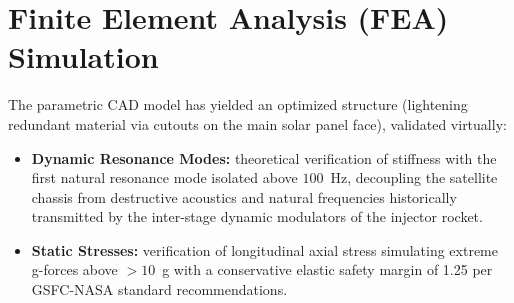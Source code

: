 \section{Finite Element Analysis (FEA) Simulation}
The parametric CAD model has yielded an optimized structure (lightening redundant material via cutouts on the main solar panel face), validated virtually:
\begin{itemize}
    \item \textbf{Dynamic Resonance Modes:} theoretical verification of stiffness with the first natural resonance mode isolated above $100$~Hz, decoupling the satellite chassis from destructive acoustics and natural frequencies historically transmitted by the inter-stage dynamic modulators of the injector rocket.
    \item \textbf{Static Stresses:} verification of longitudinal axial stress simulating extreme g-forces above $>10$~g with a conservative elastic safety margin of 1.25 per GSFC-NASA standard recommendations.
\end{itemize}

